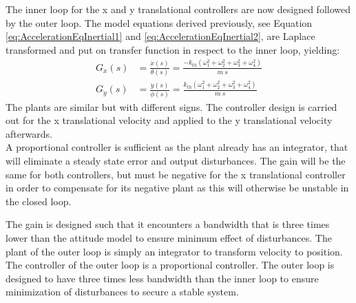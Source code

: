 The inner loop for the x and y translational controllers are now designed followed by the outer loop.
The model equations derived previously, see Equation \ref{eq:AccelerationEqInertial1} and \ref{eq:AccelerationEqInertial2}, are Laplace transformed and put on transfer function in respect to the inner loop, yielding:
\begin{align}
    G_{\dot{x}}(s)&=\frac{\dot{x} (s)}{\theta (s)}=\frac{-k_{th} (\omega_1 ^2 + \omega_2 ^2 + \omega_3 ^2 + \omega_4 ^2)}{m\ s} \\
    G_{\dot{y}}(s)&=\frac{\dot{y} (s)}{\phi (s)}=\frac{k_{th}(\omega_1 ^2 + \omega_2 ^2 + \omega_3 ^2 + \omega_4 ^2)}{m\ s} 
\end{align}
%
The plants are similar but with different signs. The controller design is carried out for the x translational velocity and applied to the y translational velocity afterwards.\\
A proportional controller is sufficient as the plant already has an integrator, that will eliminate a steady state error and output disturbances. The gain will be the same for both controllers, but must be negative for the x translational controller in order to compensate for its negative plant as this will otherwise be unstable in the closed loop.

The gain is designed such that it encounters a bandwidth that is three times lower than the attitude model to ensure minimum effect of disturbances.
The plant of the outer loop is simply an integrator to transform velocity to position. The controller of the outer loop is a proportional controller. The outer loop is designed to have three times less bandwidth than the inner loop to ensure minimization of disturbances to secure a stable system.

